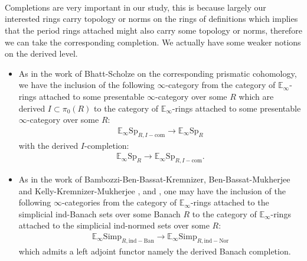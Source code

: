 \documentclass[11pt]{report}
\begin{document}
	






\






\newpage
\section{}

\indent Completions are very important in our study, this is because largely our interested rings carry topology or norms on the rings of definitions which implies that the period rings attached might also carry some topology or norms, therefore we can take the corresponding completion. We actually have some weaker notions on the derived level.


\begin{itemize}
\justifying
\item<1-> As in the work of Bhatt-Scholze \cite{BS} on the corresponding prismatic cohomology, we have the inclusion of the following $\infty$-category from the category of $\mathbb{E}_\infty$-rings attached to some presentable $\infty$-category over some $R$ which are derived $I\subset \pi_0(R)$ to the category of $\mathbb{E}_\infty$-rings attached to some presentable $\infty$-category over some $R$:
\begin{align}
\mathbb{E}_\infty\mathrm{Sp}_{R,I-\mathrm{com}}\rightarrow \mathbb{E}_\infty\mathrm{Sp}_{R}	
\end{align}
with the derived $I$-completion:
\begin{align}
\mathbb{E}_\infty\mathrm{Sp}_{R}	\rightarrow\mathbb{E}_\infty\mathrm{Sp}_{R,I-\mathrm{com}}.
\end{align}
\item<2-> As in the work of Bambozzi-Ben-Bassat-Kremnizer, Ben-Bassat-Mukherjee and Kelly-Kremnizer-Mukherjee \cite{BBBK}, \cite{BBM} and \cite{KKM}, one may have the inclusion of the following $\infty$-categories from the category of $\mathbb{E}_\infty$-rings attached to the simplicial ind-Banach sets over some Banach $R$ to the category of $\mathbb{E}_\infty$-rings attached to the simplicial ind-normed sets over some $R$:
\begin{align}
\mathbb{E}_\infty\mathrm{Simp}_{R,\mathrm{ind-Ban}}\rightarrow \mathbb{E}_\infty\mathrm{Simp}_{R,\mathrm{ind-Nor}}	
\end{align}
which admits a left adjoint functor namely the derived Banach completion.

\end{itemize}
\end{document}
